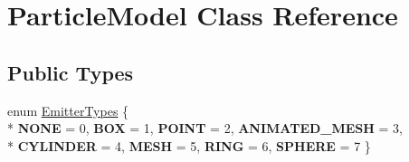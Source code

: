\hypertarget{class_particle_model}{\section{Particle\-Model Class Reference}
\label{class_particle_model}
}
\subsection*{Public Types}
\begin{DoxyCompactItemize}
\item 
enum \hyperlink{class_particle_model_a20dbdb2c6762bb19a57cb1553f73051f}{Emitter\-Types} \{ \\*
{\bfseries N\-O\-N\-E} = 0, 
{\bfseries B\-O\-X} = 1, 
{\bfseries P\-O\-I\-N\-T} = 2, 
{\bfseries A\-N\-I\-M\-A\-T\-E\-D\-\_\-\-M\-E\-S\-H} = 3, 
\\*
{\bfseries C\-Y\-L\-I\-N\-D\-E\-R} = 4, 
{\bfseries M\-E\-S\-H} = 5, 
{\bfseries R\-I\-N\-G} = 6, 
{\bfseries S\-P\-H\-E\-R\-E} = 7
 \}
\end{DoxyCompactItemize}
